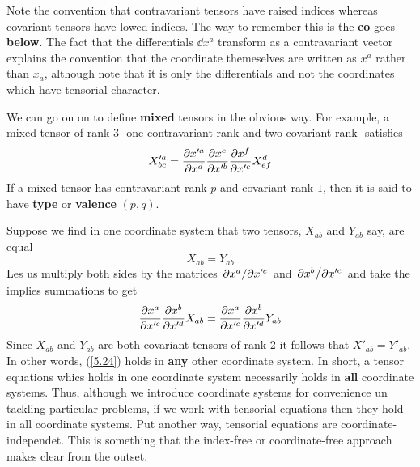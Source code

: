 Note the convention that contravariant tensors have raised indices whereas covariant tensors have lowed indices. The way to remember this is the \textbf{co} goes \textbf{below}. The fact that the differentials $\dd x^{a}$ transform as a contravariant vector explains the convention that the coordinate  themeselves are written as $x^{a}$ rather than $x_a$, although note that it is only the differentials and not the coordinates which have tensorial character. 

We can go on on to define \textbf{mixed} tensors in the obvious way. For example, a mixed tensor of rank 3- one contravariant rank and two covariant rank- satisfies
\begin{equation}\label{5.23}
  X'^{a}_{bc}=\pdv{x'^{a}}{x^d}\pdv{x^{e}}{x'^{b}}\pdv{x^f}{x'^{c}}X^{d}_{ef}
\end{equation}
If  a mixed tensor has contravariant rank $p$ and covariant rank $1$, then it is said to have \textbf{type} or \textbf{valence} $(p,q)$. 

Suppose we find in one coordinate system that two tensors, $X_{ab}$ and $Y_{ab}$ say, are equal 
\begin{equation}\label{5.24}
  X_{ab}=Y_{ab}
\end{equation}
Les us multiply both sides by the matrices $\pdv*{x^{a}}{x'^c}$ and $\pdv*{x^b}{x'^c}$ and take the implies summations to get
\begin{equation*}
  \pdv{x^{a}}{x'^c}\pdv{x^b}{x'^d}X_{ab}=\pdv{x^{a}}{x'^c}\pdv{x^b}{x'^d}Y_{ab}
\end{equation*}
Since $X_{ab}$ and $Y_{ab}$ are both covariant tensors of rank 2 it follows that $X'_{ab}=Y'_{ab}$. In other words, (\ref{5.24}) holds in \textbf{any} other coordinate system. In short, a tensor equations whics holds in one coordinate system necessarily holds in \textbf{all} coordinate systems. Thus, although we introduce coordinate systems for convenience un tackling particular problems, if we work with tensorial equations then they hold in all coordinate systems. Put another way, tensorial equations are coordinate-independet. This is something that the index-free or coordinate-free approach makes clear from the outset.

